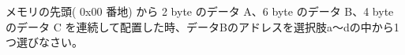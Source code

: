 メモリの先頭( 0x00 番地) から 2 byte のデータ A、6 byte のデータ B、4 byte のデータ C を連続して配置した時、データBのアドレスを選択肢a〜dの中から1つ選びなさい。
